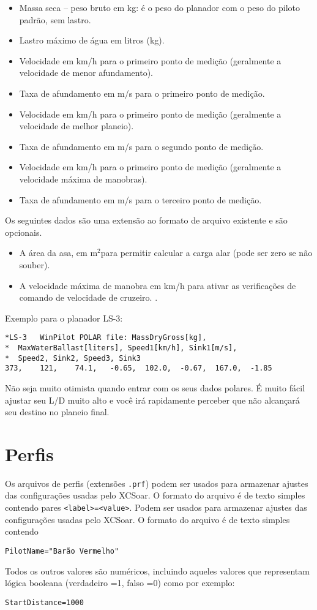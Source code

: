 \begin{itemize}
\item Massa seca – peso bruto em kg:  é o peso do planador com o peso do piloto padrão, sem lastro.
\item Lastro máximo de água em litros (kg).
\item Velocidade em km/h para o primeiro ponto de medição (geralmente a velocidade de menor afundamento).
\item Taxa de afundamento em m/s para o primeiro ponto de medição.
\item Velocidade em km/h para o primeiro ponto de medição (geralmente a velocidade de melhor planeio).
\item Taxa de afundamento em m/s para o segundo ponto de medição.
\item Velocidade em km/h para o primeiro ponto de medição (geralmente a velocidade máxima de manobras).
\item Taxa de afundamento em m/s para o terceiro ponto de medição.
\end{itemize}
Os seguintes dados são uma extensão ao formato de arquivo existente e são opcionais.
\begin{itemize}
\item A área da asa, em m$^2$para permitir calcular a carga alar (pode ser zero se não souber).
\item A velocidade máxima de manobra em km/h para ativar as verificações de comando de velocidade de cruzeiro. . 
\end{itemize}

Exemplo para o planador LS-3:
\begin{verbatim}
*LS-3	WinPilot POLAR file: MassDryGross[kg], 
*  MaxWaterBallast[liters], Speed1[km/h], Sink1[m/s], 
*  Speed2, Sink2, Speed3, Sink3  	
373,	121,	74.1,	-0.65,	102.0,	-0.67,	167.0,	-1.85
\end{verbatim}

\tip Não seja muito otimista quando entrar com os seus dados polares.  É muito fácil ajustar seu L/D muito alto e você irá rapidamente perceber que não alcançará seu destino no planeio final.

\section{Perfis}

Os arquivos de perfis (extensões \verb|.prf|) podem ser usados para armazenar ajustes das configurações usadas pelo XCSoar.  O formato do arquivo é de texto simples contendo pares \verb|<label>=<value>|.  Podem ser usados para armazenar ajustes das configurações usadas pelo XCSoar.  O formato do arquivo é de texto simples contendo
\begin{verbatim}
PilotName="Barão Vermelho"
\end{verbatim}
Todos os outros valores são numéricos, incluindo aqueles valores que representam lógica booleana (verdadeiro =1, falso =0) como por exemplo:
\begin{verbatim}
StartDistance=1000
\end{verbatim}

